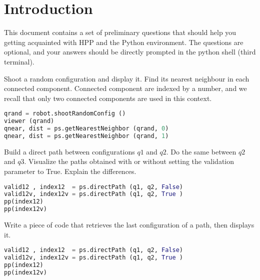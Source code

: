\documentclass[10pt]{exam}
\begin{document}

\section{Introduction}
This document contains a set of preliminary questions that should help you getting acquainted with HPP and the Python environment.
The questions are optional, and your answers should be directly prompted in the python shell (third terminal).


\begin{questions}
\question Shoot a random configuration and display it. Find its nearest neighbour in each connected component. Connected component are indexed by a number, and we recall
that only two connected components are used in this context.

\begin{solutionorlines}
\begin{lstlisting}[language=python]
qrand = robot.shootRandomConfig ()
viewer (qrand)
qnear, dist = ps.getNearestNeighbor (qrand, 0)
qnear, dist = ps.getNearestNeighbor (qrand, 1)
\end{lstlisting}
\end{solutionorlines}

\question Build a direct path between configurations $q1$ and $q2$. Do the same between $q2$ and $q3$. Visualize the paths obtained with or without 
setting the validation parameter to True. Explain the differences.
\begin{solutionorlines}
\begin{lstlisting}[language=python]
valid12 , index12  = ps.directPath (q1, q2, False)
valid12v, index12v = ps.directPath (q1, q2, True )
pp(index12)
pp(index12v)
\end{lstlisting}
\end{solutionorlines}

\question Write a piece of code that retrieves the last configuration of a path, then displays it.
\begin{solutionorlines}
\begin{lstlisting}[language=python]
valid12 , index12  = ps.directPath (q1, q2, False)
valid12v, index12v = ps.directPath (q1, q2, True )
pp(index12)
pp(index12v)
\end{lstlisting}
\end{solutionorlines}


\end{questions}
\end{document}
